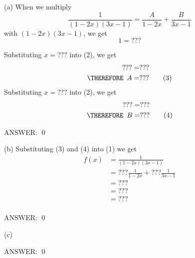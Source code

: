 (a) When we multiply
\[
\frac{1}{(1 - 2x)(3x - 1)} = \frac{A}{1 - 2x} + \frac{B}{3x - 1} \tag{1}
\]
with $(1 - 2x)(3x - 1)$, we get
\[
1 = ??? \tag{2}
\]

Substituting $x = ???$ into (2), we get
\begin{align*}
                 ??? &= ??? \\
\THEREFORE  \,\,\, A &= ??? \tag{3} 
\end{align*}
Substituting $x = ???$ into (2), we get
\begin{align*}
                  ??? &= ??? \\
\THEREFORE \,\,\, B   &= ??? \tag{4} 
\end{align*}

ANSWER:
\qed


(b)
Substituting (3) and (4) into (1) we get
\begin{align*}
f(x) 
&= \frac{1}{(1 - 2x)(3x - 1)} 
\\
&= ??? \frac{1}{1 - 2x} + ??? \frac{1}{3x - 1} 
\\
&= ??? 
\\
&= ??? 
\\
&= ??? 
\\
\end{align*}

ANSWER:
\qed

(c)

ANSWER:
\qed
